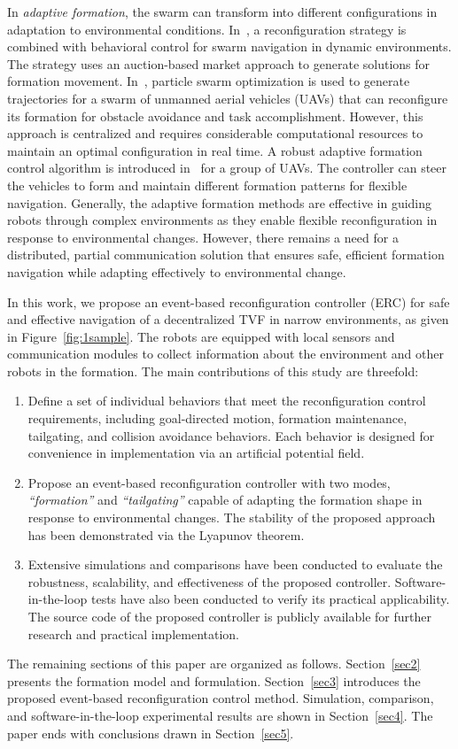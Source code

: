 In \textit{adaptive formation}, the swarm can transform into different configurations in adaptation to environmental conditions. In~\cite{Fu2020}, a reconfiguration strategy is combined with behavioral control for swarm navigation in dynamic environments. The strategy uses an auction-based market approach to generate solutions for formation movement. In~\cite{8843165}, particle swarm optimization is used to generate trajectories for a swarm of unmanned aerial vehicles (UAVs) that can reconfigure its formation for obstacle avoidance and task accomplishment. However, this approach is centralized and requires considerable computational resources to maintain an optimal configuration in real time. A robust adaptive formation control algorithm is introduced in~\cite{Mung2019} for a group of UAVs. The controller can steer the vehicles to form and maintain different formation patterns for flexible navigation. Generally, the adaptive formation methods are effective in guiding robots through complex environments as they enable flexible reconfiguration in response to environmental changes. However, there remains a need for a distributed, partial communication solution that ensures safe, efficient formation navigation while adapting effectively to environmental change.

In this work, we propose an event-based reconfiguration controller (ERC) for safe and effective navigation of a decentralized TVF in narrow environments, as given in Figure~\ref{fig:1sample}. The robots are equipped with local sensors and communication modules to collect information about the environment and other robots in the formation. The main contributions of this study are threefold:
\begin{enumerate}
    \item Define a set of individual behaviors that meet the reconfiguration control requirements, including goal-directed motion, formation maintenance, tailgating, and collision avoidance behaviors. Each behavior is designed for convenience in implementation via an artificial potential field.
        \item Propose an event-based reconfiguration controller with two modes, \textit{``formation''} and \textit{``tailgating''} capable of adapting the formation shape in response to environmental changes. The stability of the proposed approach has been demonstrated via the Lyapunov theorem.
    \item Extensive simulations and comparisons have been conducted to evaluate the robustness, scalability, and effectiveness of the proposed controller. Software-in-the-loop tests have also been conducted to verify its practical applicability. The source code of the proposed controller is publicly available for further research and practical implementation.
\end{enumerate}

The remaining sections of this paper are organized as follows. Section~\ref{sec2} presents the formation model and formulation. Section~\ref{sec3} introduces the proposed event-based reconfiguration control method. Simulation, comparison, and software-in-the-loop experimental results are shown in Section~\ref{sec4}. The paper ends with conclusions drawn in Section~\ref{sec5}.